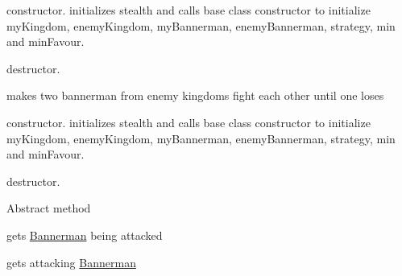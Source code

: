 \begin{DoxyRefList}
\item[Member \mbox{\hyperlink{class_battle_field_a55cdd1fe446cff45e718103ce14d3085}{Battle\+Field\+::Battle\+Field}} (int min, int min\+Favour)]\label{todo__todo000007}%
%
constructor. initializes stealth and calls base class constructor to initialize my\+Kingdom, enemy\+Kingdom, my\+Bannerman, enemy\+Bannerman, strategy, min and min\+Favour.  
\item[Member \mbox{\hyperlink{class_battle_field_adf5797b1520be6502b828196690b9348}{Battle\+Field\+::$\sim$\+Battle\+Field}} ()]\label{todo__todo000009}%
%
destructor.  
\item[Member \mbox{\hyperlink{class_siege_ae8e9de64c3a659bf32bb35ad4cbcbc2f}{Siege\+::attack}} (\mbox{\hyperlink{class_bannerman}{Bannerman}} $\ast$my\+Bannerman, \mbox{\hyperlink{class_bannerman}{Bannerman}} $\ast$enemy\+Bannerman)]\label{todo__todo000011}%
%
makes two bannerman from enemy kingdoms fight each other until one loses  
\item[Member \mbox{\hyperlink{class_siege_a58bf6483aa888973ab9ead36635234fc}{Siege\+::Siege}} (int stealth, int min, int min\+Favour)]\label{todo__todo000010}%
%
constructor. initializes stealth and calls base class constructor to initialize my\+Kingdom, enemy\+Kingdom, my\+Bannerman, enemy\+Bannerman, strategy, min and min\+Favour.  
\item[Member \mbox{\hyperlink{class_siege_aac2d09fe50a26b39865aad8c8c9486b9}{Siege\+::$\sim$\+Siege}} ()]\label{todo__todo000012}%
%
destructor.  
\item[Member \mbox{\hyperlink{class_strategy_adecf5b4398ec2dd89bd280441f674de3}{Strategy\+::attack}} (\mbox{\hyperlink{class_bannerman}{Bannerman}} $\ast$my\+Bannerman, \mbox{\hyperlink{class_bannerman}{Bannerman}} $\ast$enemy\+Bannerman)=0]\label{todo__todo000014}%
%
Abstract method  
\item[Member \mbox{\hyperlink{class_strategy_a88ed4a64031030f3a9a30652b01debe6}{Strategy\+::get\+Enemy\+Bannerman}} ()]\label{todo__todo000017}%
%
gets \mbox{\hyperlink{class_bannerman}{Bannerman}} being attacked  
\item[Member \mbox{\hyperlink{class_strategy_a0931adab8a2fe9b3cf68bbd626e10b3a}{Strategy\+::get\+My\+Bannerman}} ()]\label{todo__todo000016}%
%
gets attacking \mbox{\hyperlink{class_bannerman}{Bannerman}}  

\end{DoxyRefList}
